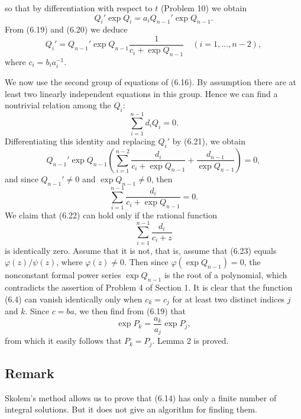 \documentclass{article}
\begin{document}
so that by differentiation with respect to $t$ (Problem 10) we obtain
\begin{equation}
Q_i' \exp Q_i = a_i Q_{n-1}' \exp Q_{n-1}.
\end{equation}
From (6.19) and (6.20) we deduce
\begin{equation}
Q_i' = Q_{n-1}' \exp Q_{n-1} \frac{1}{c_i + \exp Q_{n-1}} \quad (i = 1, \ldots, n - 2),
\end{equation}
where $c_i = b_i a_i^{-1}$.

We now use the second group of equations of (6.16). By assumption there are at least two linearly independent equations in this group. Hence we can find a nontrivial relation among the $Q_i$:
\begin{equation}
\sum_{i=1}^{n-1} d_i Q_i = 0.
\end{equation}
Differentiating this identity and replacing $Q_i'$ by (6.21), we obtain
\begin{equation}
Q_{n-1}' \exp Q_{n-1} \left( \sum_{i=1}^{n-2} \frac{d_i}{c_i + \exp Q_{n-1}} + \frac{d_{n-1}}{\exp Q_{n-1}} \right) = 0,
\end{equation}
and since $Q_{n-1}' \neq 0$ and $\exp Q_{n-1} \neq 0$, then
\begin{equation}
\sum_{i=1}^{n-1} \frac{d_i}{c_i + \exp Q_{n-1}} = 0.
\end{equation}
We claim that (6.22) can hold only if the rational function
\begin{equation}
\sum_{i=1}^{n-1} \frac{d_i}{c_i + z}
\end{equation}
is identically zero. Assume that it is not, that is, assume that (6.23) equals $\varphi(z)/\psi(z)$, where $\varphi(z) \neq 0$. Then since $\varphi(\exp Q_{n-1}) = 0$, the nonconstant formal power series $\exp Q_{n-1}$ is the root of a polynomial, which contradicts the assertion of Problem 4 of Section 1. It is clear that the function (6.4) can vanish identically only when $c_k = c_j$ for at least two distinct indices $j$ and $k$. Since $c = ba$, we then find from (6.19) that
\begin{equation}
\exp P_k = \frac{a_k}{a_j} \exp P_j,
\end{equation}
from which it easily follows that $P_k = P_j$. Lemma 2 is proved.

\subsection*{Remark}
Skolem's method allows us to prove that (6.14) has only a finite number of integral solutions. But it does not give an algorithm for finding them.
\end{document}
